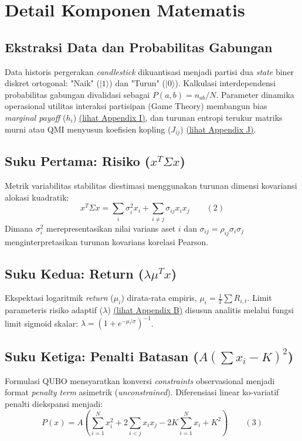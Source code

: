 \hypertarget{detail-komponen-matematis}{%
\section{Detail Komponen Matematis}\label{detail-komponen-matematis}}

\subsection{Ekstraksi Data dan Probabilitas Gabungan}\label{ekstraksi-data}
Data historis pergerakan \emph{candlestick} dikuantisasi menjadi partisi dua \emph{state} biner diskret ortogonal: "Naik" (\(|1\rangle\)) dan "Turun" (\(|0\rangle\)). Kalkulasi interdependensi probabilitas gabungan divalidasi sebagai \( P(a,b) = n_{ab} / N \). Parameter dinamika operasional utilitas interaksi partisipan (Game Theory) membangun bias \emph{marginal payoff} (\( h_i \)) \hyperref[appendix-i]{(lihat Appendix I)}, dan turunan entropi terukur matriks murni atau QMI menyusun koefisien kopling (\( J_{ij} \)) \hyperref[appendix-j]{(lihat Appendix J)}.

\subsection{\texorpdfstring{Suku Pertama: Risiko (\(x^T \Sigma x\))}{Suku Pertama: Risiko (x\^{}T \textbackslash Sigma x)}}\label{a.-suku-pertama-risiko-xt-sigma-x}
Metrik variabilitas stabilitas diestimasi menggunakan turunan dimensi kovariansi alokasi kuadratik:
\[ x^T \Sigma x = \sum_i \sigma_i^2 x_i + \sum_{i \ne j} \sigma_{ij} x_i x_j \qquad (2) \]
Dimana \(\sigma_i^2\) merepresentasikan nilai varians aset \(i\) dan \( \sigma_{ij} = \rho_{ij} \sigma_i \sigma_j \) menginterpretasikan turunan kovarians korelasi Pearson.

\subsection{\texorpdfstring{Suku Kedua: Return (\(\lambda \mu^T x\))}{Suku Kedua: Return (\textbackslash lambda \textbackslash mu\^{}T x)}}\label{b.-suku-kedua-return-lambda-mut-x}
Ekspektasi logaritmik \emph{return} (\(\mu_i\)) dirata-rata empiris, \( \mu_i = \frac{1}{T} \sum R_{i,t} \). Limit parameteris risiko adaptif (\(\lambda\)) \hyperref[appendix-b]{(lihat Appendix B)} disusun analitis melalui fungsi limit sigmoid skalar: \( \lambda = (1 + e^{-\mu/\sigma})^{-1} \).

\subsection{\texorpdfstring{Suku Ketiga: Penalti Batasan (\(A (\sum x_i - K)^2\))}{Suku Ketiga: Penalti Batasan}}\label{c.-suku-ketiga-penalti-batasan}
Formulasi QUBO mensyaratkan konversi \emph{constraints} observasional menjadi format \emph{penalty term} asimetrik (\emph{unconstrained}). Diferensiasi linear ko-variatif penalti diekspansi menjadi:
\[ P(x) = A \left( \sum_{i=1}^N x_i^2 + 2\sum_{i<j} x_i x_j - 2K\sum_{i=1}^N x_i + K^2 \right) \qquad (3) \]


